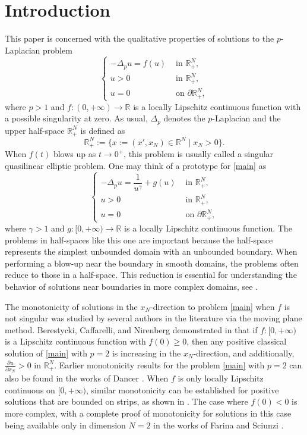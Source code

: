 \documentclass[reqno]{amsart}
\theoremstyle{plain}
\theoremstyle{definition}
\theoremstyle{remark}
\begin{document}
	\section{Introduction}
	This paper is concerned with the qualitative properties of solutions to the $p$-Laplacian problem
	\begin{equation}\label{main}
		\begin{cases}
			-\Delta_p u = f(u) & \text{ in } \mathbb{R}^N_+,\\
			u>0 & \text{ in } \mathbb{R}^N_+,\\
			u=0 & \text{ on } \partial\mathbb{R}^N_+,
		\end{cases}
	\end{equation}
	where $p>1$ and $f:(0,+\infty)\to\mathbb{R}$ is a locally Lipschitz continuous function with a possible singularity at zero. As usual, $\Delta_p$ denotes the $p$-Laplacian and the upper half-space $\mathbb{R}^N_+$ is defined as
	\[
	\mathbb{R}^N_+ := \{x:=(x',x_N)\in\mathbb{R}^N \mid x_N>0 \}.
	\]
	When $f(t)$ blows up as $t\to0^+$, this problem is usually called a singular quasilinear elliptic problem. One may think of a prototype for \eqref{main} as
	\begin{equation}\label{singular}
		\begin{cases}
			-\Delta_p u = \dfrac{1}{u^\gamma} + g(u) & \text{ in } \mathbb{R}^N_+,\\
			u>0 & \text{ in } \mathbb{R}^N_+,\\
			u=0 & \text{ on } \partial\mathbb{R}^N_+,
		\end{cases}
	\end{equation}
	where $\gamma>1$ and $g:[0,+\infty)\to\mathbb{R}$ is a locally Lipschitz continuous function.
	The problems in half-spaces like this one are important because the half-space represents the simplest unbounded domain with an unbounded boundary. When performing a blow-up near the boundary in smooth domains, the problems often reduce to those in a half-space. This reduction is essential for understanding the behavior of solutions near boundaries in more complex domains, see \cite{MR3912757,MR4044739}.
	
	The monotonicity of solutions in the $x_N$-direction to problem \eqref{main} when $f$ is not singular was studied by several authors in the literature via the moving plane method. Berestycki, Caffarelli, and Nirenberg demonstrated in \cite{MR1395408,MR1655510} that if \( f:[0,+\infty) \) is a Lipschitz continuous function with \( f(0) \geq 0 \), then any positive classical solution of \eqref{main} with \( p = 2 \) is increasing in the \( x_N \)-direction, and additionally, \( \frac{\partial u}{\partial x_N} > 0 \) in \( \mathbb{R}^N_+ \). Earlier monotonicity results for the problem \eqref{main} with \( p = 2 \) can also be found in the works of Dancer \cite{MR1190345,MR2525168}. When \( f \) is only locally Lipschitz continuous on $[0,+\infty)$, similar monotonicity can be established for positive solutions that are bounded on strips, as shown in \cite{MR4142367,MR2254600}. The case where \( f(0) < 0 \) is more complex, with a complete proof of monotonicity for solutions in this case being available only in dimension \( N = 2 \) in the works of Farina and Sciunzi \cite{MR3593525,MR3641643}.
	
\end{document}
